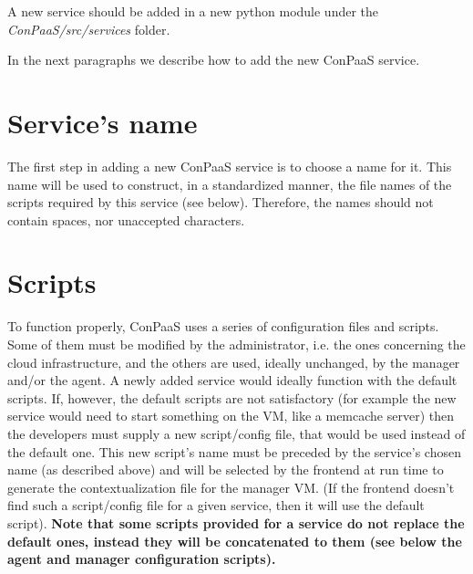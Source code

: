 \documentclass[10pt]{article}
\begin{document}
A new service should be added in a new python module under the \textit{ConPaaS/src/services} folder. \\


In the next paragraphs we describe how to add the new ConPaaS service.

\section{Service's name}

The first step in adding a new ConPaaS service is to choose a name for it. This name will be used to construct, in a standardized manner, the file names of the scripts required by this service (see below). Therefore, the names should not contain spaces, nor unaccepted characters. 

\section{Scripts}
To function properly, ConPaaS uses a series of configuration files and scripts. Some of them must be modified by the administrator, i.e. the ones concerning the cloud infrastructure, and the others are used, ideally unchanged, by the manager and/or the agent. A newly added service would ideally function with the default scripts. If, however, the default scripts are not satisfactory (for example the new service would need to start something on the VM, like a memcache server) then the developers must supply a new script/config file, that would be used instead of the default one. This new script's name must be preceded by the service's chosen name (as described above) and will be selected by the frontend at run time to generate the contextualization file for the manager VM. (If the frontend doesn't find such a script/config file for a given service, then it will use the default script). \textbf{Note that some scripts provided for a service do not replace the default ones, instead they will be concatenated to them (see below the agent and manager configuration scripts).}
\end{document}
